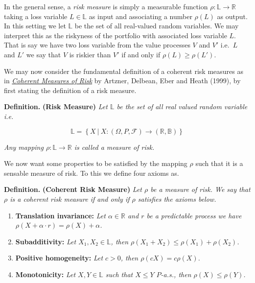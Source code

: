 \documentclass[a4paper,12pt,openany]{book}
\providecommand{\tightlist}{%
 \setlength{\itemsep}{0pt}\setlength{\parskip}{0pt}}
\begin{document}
In the general sense, a \emph{risk measure} is simply a measurable function \(\rho : \mathbb{L} \to\mathbb{R}\) taking a loss variable \(L\in \mathbb{L}\) as input and associating a number \(\rho(L)\) as output. In this setting we let \(\mathbb{L}\) be the set of all real-valued random variables. We may interpret this as the riskyness of the portfolio with associated loss variable \(L\). That is say we have two loss variable from the value processes \(V\) and \(V'\) i.e.~\(L\) and \(L'\) we say that \(V\) is riskier than \(V'\) if and only if \(\rho(L)\ge \rho(L')\).

We may now consider the fundamental definition of a coherent risk measures as in \href{https://www.researchgate.net/publication/227614132_Coherent_Measures_of_Risk}{\emph{Coherent Measures of Risk}} by Artzner, Delbean, Eber and Heath (1999), by first stating the definition of a risk measure.

\textbf{Definition.} \textbf{(Risk Measure)} \emph{Let \(\mathbb{L}\) be the set of all real valued random variable i.e.}

\[
\mathbb{L}=\left\{X\ \vert \ X : (\Omega,P,\mathcal{F})\to (\mathbb{R},\mathbb{B})\right\}
\]

\emph{Any mapping \(\rho : \mathbb{L} \to\mathbb{R}\) is called a measure of risk.}

We now want some properties to be satisfied by the mapping \(\rho\) such that it is a sensable measure of risk. To this we define four axioms as.

\textbf{Definition.} \textbf{(Coherent Risk Measure)} \emph{Let \(\rho\) be a measure of risk. We say that \(\rho\) is a coherent risk measure if and only if \(\rho\) satisfies the axioms below.}

\begin{enumerate}
\def\labelenumi{\arabic{enumi}.}
\tightlist
\item
  \textbf{Translation invariance:} \emph{Let \(\alpha\in\mathbb{R}\) and \(r\) be a predictable process we have \(\rho(X+\alpha\cdot r)=\rho(X)+\alpha\).}
\item
  \textbf{Subadditivity:} \emph{Let \(X_1,X_2\in\mathbb{L}\), then \(\rho(X_1+X_2)\le \rho(X_1)+\rho(X_2)\).}
\item
  \textbf{Positive homogeneity:} \emph{Let \(c>0\), then \(\rho(cX)=c\rho(X)\).}
\item
  \textbf{Monotonicity:} \emph{Let \(X,Y\in\mathbb{L}\) such that \(X\le Y\) \(P\)-a.s., then \(\rho(X)\le \rho(Y)\).}
\end{enumerate}
\end{document}
